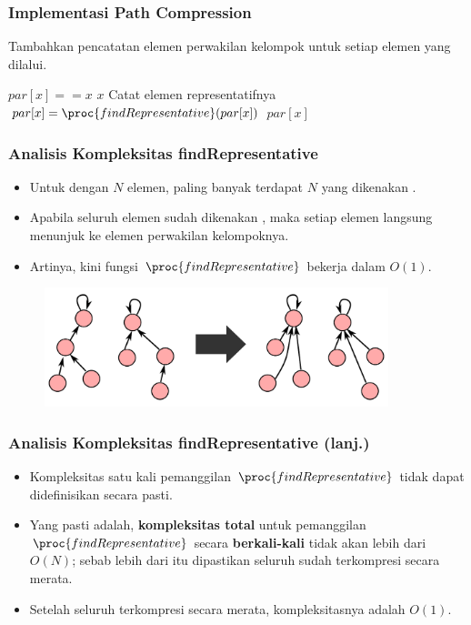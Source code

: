 \begin{frame}
\frametitle{Implementasi Path Compression}
Tambahkan pencatatan elemen perwakilan kelompok untuk setiap elemen yang dilalui.
\begin{codebox}
\li \If $par[x] == x$ \Then
\li   \Return $x$
\li \Else
\li   \Comment Catat elemen representatifnya
\li   $par[x] = \proc{findRepresentative}(par[x])$ 
\li   \Return $par[x]$
    \End
\end{codebox}
\end{frame}

\begin{frame}
\frametitle{Analisis Kompleksitas findRepresentative}
\begin{itemize}
  \item Untuk \pdjs dengan $N$ elemen, paling banyak terdapat $N$  yang dikenakan .
  \item Apabila seluruh  elemen sudah dikenakan , maka setiap elemen langsung menunjuk ke elemen perwakilan kelompoknya.
  \item Artinya, kini fungsi $\proc{findRepresentative}$ bekerja dalam $O(1)$.
\end{itemize}
\begin{figure}
  \includegraphics[width=10cm]{asset/djs-flat.pdf}
\end{figure}
\end{frame}

\begin{frame}
\frametitle{Analisis Kompleksitas findRepresentative (lanj.)}
\begin{itemize}
  \item Kompleksitas satu kali pemanggilan $\proc{findRepresentative}$ tidak dapat didefinisikan secara pasti.
  \item Yang pasti adalah, \textbf{kompleksitas total} untuk pemanggilan $\proc{findRepresentative}$ secara \textbf{berkali-kali} tidak akan lebih dari $O(N)$; sebab lebih dari itu dipastikan seluruh  sudah terkompresi secara merata.
  \item Setelah seluruh  terkompresi secara merata, kompleksitasnya adalah $O(1)$.
\end{itemize}
\end{frame}

